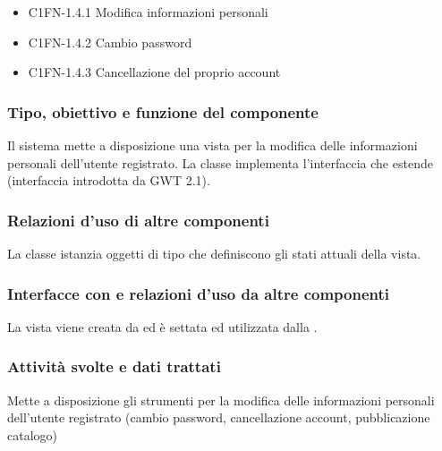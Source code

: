 \begin{itemize}
\subsubsection*{Requisiti obbligatori soddisfatti}
\begin{itemize}
   \item C1FN-1.4 Gestione profilo personale
   \item C1FN-1.4.1 Modifica informazioni personali
   \item C1FN-1.4.2 Cambio password
   \item C1FN-1.4.3 Cancellazione del proprio account
\end{itemize}
\subsubsection*{Tipo, obiettivo e funzione del componente}
Il sistema mette a disposizione una vista per la
modifica delle informazine profilo personale
   \item C1FN-1.4.1 Modifica informazioni personali
   \item C1FN-1.4.2 Cambio password
   \item C1FN-1.4.3 Cancellazione del proprio account
\end{itemize}
\subsubsection*{Tipo, obiettivo e funzione del componente}
Il sistema mette a disposizione una vista per la
modifica delle informazioni personali dell'utente registrato. La classe
 implementa l'interfaccia  che estende
 (interfaccia introdotta da GWT 2.1).

\subsubsection*{Relazioni d'uso di altre componenti}
La classe istanzia oggetti di tipo  che definiscono gli stati
attuali della vista.
\subsubsection*{Interfacce con e relazioni d'uso da altre componenti}
La vista viene creata da  ed \`e settata ed utilizzata dalla
.
\subsubsection*{Attivit\`a svolte e dati trattati}
Mette a disposizione gli strumenti per la modifica delle informazioni personali
dell'utente registrato (cambio password, cancellazione account,
pubblicazione catalogo)

